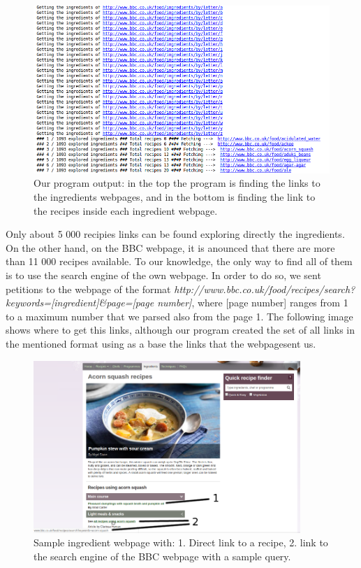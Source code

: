 \documentclass[paper=a4, fontsize=11pt]{scrartcl} %
\numberwithin{equation}{section} %
\numberwithin{figure}{section} %
\numberwithin{table}{section} %
\begin{document}
\begin{figure}[H]
\centering
\includegraphics[width=1\textwidth]{images/downloadslinks}
\caption{Our program output: in the top the program is finding the links to the ingredients webpages, and in the bottom is finding the link to the recipes inside each ingredient webpage.}
\end{figure}

Only about 5 000 recipies links can be found exploring directly the ingredients. On the other hand, on the BBC webpage, it is anounced that there are more than 11 000 recipes available. To our knowledge, the only way to find all of them is to use the search engine of the own webpage. In order to do so, we sent petitions to the webpage of the format \textit{http://www.bbc.co.uk/food/recipes/search?keywords=[ingredient]\&page=[page number]}, where [page number] ranges from 1 to a maximum number that we parsed also from the page 1. The following image shows where to get this links, although our program created the set of all links in the mentioned format using as a base the links that the webpagesent us.

\begin{figure}[H]
\centering
\includegraphics[width=0.9\textwidth]{images/ingredient}
\caption{Sample ingredient webpage with: 1. Direct link to a recipe, 2. link to the search engine of the BBC webpage with a sample query.}
\end{figure}
\end{document}
